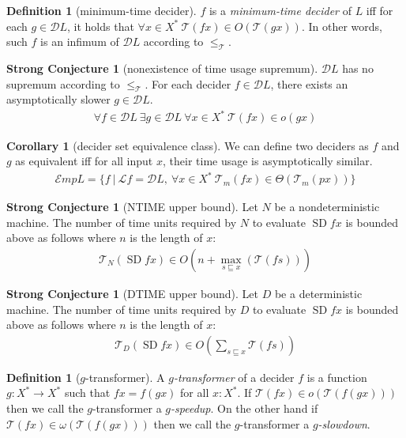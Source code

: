 \documentclass[10pt,statementpaper]{memoir}
\theoremstyle{definition}
\newcounter{thmctr}
\newtheorem{mdef}[thmctr]{Definition}
\newtheorem{msco}[thmctr]{Strong Conjecture}
\newtheorem{mcor}[thmctr]{Corollary}
\newcommand\decset{\mathcal D}
\newcommand\langset{\mathcal L}
\newcommand\TC{\mathcal{T}}
\newcommand\leTC{\ensuremath{\le_\TC}}
\newcommand\SDP{\ensuremath{\operatorname{SD}}}
\begin{document}
\begin{mdef}[minimum-time decider]
    $f$ is a \emph{minimum-time decider} of $L$ iff for each $g \in \decset L$,
    it holds that $\forall x \in X^* ~ \TC(fx) \in O(\TC(gx))$.
    In other words, such $f$ is an infimum of $\decset L$ according to $\leTC$.
\end{mdef}

\begin{msco}[nonexistence of time usage supremum]
    $\decset L$ has no supremum according to $\leTC$.
    For each decider $f \in \decset L$, there exists an asymptotically slower $g \in \decset L$.
    \begin{align}
        \forall f \in \decset L ~ \exists g \in \decset L ~ \forall x \in X^* ~ \TC(fx) \in o(gx)
    \end{align}
\end{msco}

\begin{mcor}[decider set equivalence class]
    We can define two deciders as $f$ and $g$
    as equivalent iff for all input $x$,
    their time usage is asymptotically similar.
    \begin{align}
        \mathcal E m p L = \{ f ~|~ \langset f = \decset L, ~ \forall x \in X^* ~ \TC_m(fx) \in \Theta(\TC_m(px)) \}
    \end{align}
\end{mcor}

\begin{msco}[NTIME upper bound]
    Let $N$ be a nondeterministic machine.
    The number of time units required by $N$
    to evaluate $\SDP fx$ is bounded above as follows
    where $n$ is the length of $x$:
    \begin{align}
        \TC_N(\SDP fx) \in O\left(n + \max_{s \sqsubseteq x} (\TC(fs))\right)
    \end{align}
\end{msco}

\begin{msco}[DTIME upper bound]
    Let $D$ be a deterministic machine.
    The number of time units required by $D$
    to evaluate $\SDP fx$ is bounded above as follows
    where $n$ is the length of $x$:
    \begin{align}
        \TC_D(\SDP fx) \in O \left( \sum_{s \sqsubseteq x} \TC(fs) \right)
    \end{align}
\end{msco}

\begin{mdef}[$g$-transformer]
    A \emph{$g$-transformer} of a decider $f$ is a function $g : X^* \to X^*$
    such that $fx = f(gx)$ for all $x : X^*$.
    If $\TC(fx) \in o(\TC(f(gx)))$ then
    we call the $g$-transformer a \emph{$g$-speedup}.
    On the other hand if $\TC(fx) \in \omega(\TC(f(gx)))$ then
    we call the $g$-transformer a \emph{$g$-slowdown}.
\end{mdef}
\end{document}
